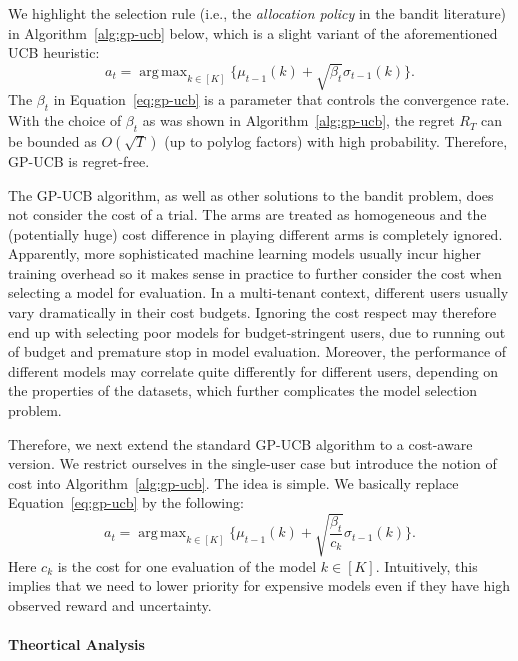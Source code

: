 \documentclass[letterpaper]{vldb}
\DeclareMathOperator*{\argmax}{arg\,max}
\begin{document}
We highlight the selection rule (i.e., the {\em allocation policy} in the bandit literature) in Algorithm~\ref{alg:gp-ucb} below, which is a slight variant of the aforementioned UCB heuristic:
\begin{equation}\label{eq:gp-ucb}
a_t = \argmax_{k\in [K]}\{\mu_{t-1}(k) + \sqrt{\beta_t}\sigma_{t-1}(k)\}.
\end{equation}
The $\beta_t$ in Equation~\ref{eq:gp-ucb} is a parameter that controls the convergence rate. With the choice of $\beta_t$ as was shown in Algorithm~\ref{alg:gp-ucb}, the regret $R_T$ can be bounded as $O(\sqrt{T})$ (up to polylog factors) with high probability. Therefore, GP-UCB is regret-free.

The GP-UCB algorithm, as well as other solutions to the bandit problem, does not consider the cost of a trial.
The arms are treated as homogeneous and the (potentially huge) cost difference in playing different arms is completely ignored.
Apparently, more sophisticated machine learning models usually incur higher training overhead so it makes sense in practice to further consider the cost when selecting a model for evaluation.
In a multi-tenant context, different users usually vary dramatically in their cost budgets.
Ignoring the cost respect may therefore end up with selecting poor models for budget-stringent users, due to running out of budget and premature stop in model evaluation.
Moreover, the performance of different models may correlate quite differently for different users, depending on the properties of the datasets, which further complicates the model selection problem.

Therefore, we next extend the standard GP-UCB algorithm to a cost-aware version.
We restrict ourselves in the single-user case but introduce the notion of cost into Algorithm~\ref{alg:gp-ucb}.
The idea is simple. We basically replace Equation~\ref{eq:gp-ucb} by the following:
\begin{equation}\label{eq:gp-ucb:cost}
a_t = \argmax_{k\in [K]}\{\mu_{t-1}(k) + \sqrt{\frac{\beta_t}{c_k}}\sigma_{t-1}(k)\}.
\end{equation}
Here $c_k$ is the cost for one evaluation of the model $k\in[K]$.
Intuitively, this implies that we need to lower priority for expensive models even if they have high observed reward and uncertainty.

\paragraph*{Theortical Analysis}
\end{document}
